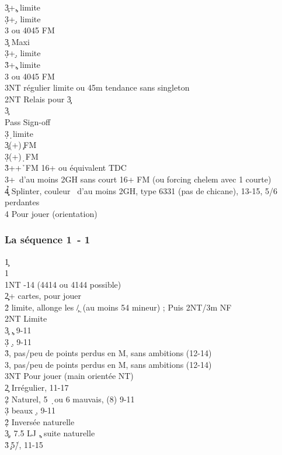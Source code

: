 \documentclass[a4paper]{article}
\begin{document}
\begin{bidtable}
3\c {}+\c , limite\\
3\d {}+\d , limite\\
3\s {} ou 4045 FM\-\\
3\c \> Maxi\+\\
3\d {}+\d , limite\\
3\h {}+\c , limite\\
3\s {} ou 4045 FM\\
3NT \> régulier limite ou 4\s 5m tendance sans singleton\-\-\\
2NT \> Relais pour 3\c \+\\
3\c\+\\
Pass \> Sign-off \c \\
3\d {}\d\ limite\-\-\\
3\c {}(+)\c\ FM\\
3\d {}(+)\d\ FM\\
3\h {}++\h\ FM 16+ ou équivalent TDC\\
3\s {}+\s\ d'au moins 2GH sans court 16+ FM (ou forcing chelem avec 1 courte)\\
4\c\d\h \> Splinter, couleur \s\ d'au moins 2GH, type 6331 (pas de chicane), 13-15, 5/6 perdantes\\
4\s \> Pour jouer (orientation)\-
\end{bidtable}

\subsubsection{La séquence 1\pdfc\ - 1\pdfs}

\begin{bidtable}
1\c\+\\
1\s\+\\
1NT -14 (4414 ou 4144 possible)\+\\
2\c\d {}+ cartes, pour jouer\\
2\h\s \> limite, allonge les \c /\d\ (au moins 54 mineur) ; Puis 2NT/3m NF\\
2NT \> Limite\\
3\c {} \c , 9-11\\
3\d {} \d , 9-11\\
3\h {}, pas/peu de points perdus en M, sans ambitions (12-14)\\
3\s {}, pas/peu de points perdus en M, sans ambitions (12-14)\\
3NT \> Pour jouer (main orientée NT)\-\\
2\c \> Irrégulier, 11-17\+\\
2\d \> Naturel, 5 \d\ ou 6 mauvais, (8) 9-11\\
3\d {} beaux \d , 9-11\-\\
2\d\h\s \> Inversée naturelle\\
3\c {}, 7.5 LJ \c , suite naturelle\\
3\h\s {}\c\ 5\h /\s , 11-15\-\-
\end{bidtable}
\end{document}
